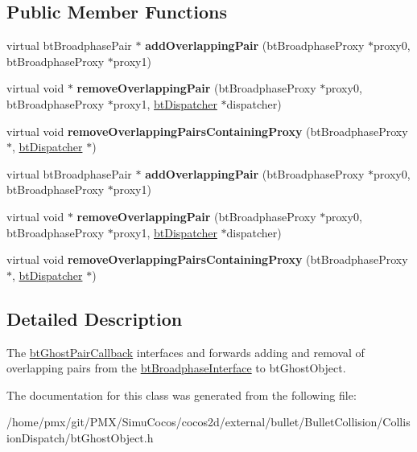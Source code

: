 \subsection*{Public Member Functions}
\begin{DoxyCompactItemize}
\item 
\mbox{\label{classbtGhostPairCallback_ab7f244b881471dfe7ba8ed92f4b7f30f}} 
virtual bt\+Broadphase\+Pair $\ast$ {\bfseries add\+Overlapping\+Pair} (bt\+Broadphase\+Proxy $\ast$proxy0, bt\+Broadphase\+Proxy $\ast$proxy1)
\item 
\mbox{\label{classbtGhostPairCallback_a486c0047f31e9eca3e99d78500a989d4}} 
virtual void $\ast$ {\bfseries remove\+Overlapping\+Pair} (bt\+Broadphase\+Proxy $\ast$proxy0, bt\+Broadphase\+Proxy $\ast$proxy1, \hyperlink{classbtDispatcher}{bt\+Dispatcher} $\ast$dispatcher)
\item 
\mbox{\label{classbtGhostPairCallback_af0107f58ace1c7421f51f9bf026dc57f}} 
virtual void {\bfseries remove\+Overlapping\+Pairs\+Containing\+Proxy} (bt\+Broadphase\+Proxy $\ast$, \hyperlink{classbtDispatcher}{bt\+Dispatcher} $\ast$)
\item 
\mbox{\label{classbtGhostPairCallback_ab7f244b881471dfe7ba8ed92f4b7f30f}} 
virtual bt\+Broadphase\+Pair $\ast$ {\bfseries add\+Overlapping\+Pair} (bt\+Broadphase\+Proxy $\ast$proxy0, bt\+Broadphase\+Proxy $\ast$proxy1)
\item 
\mbox{\label{classbtGhostPairCallback_a486c0047f31e9eca3e99d78500a989d4}} 
virtual void $\ast$ {\bfseries remove\+Overlapping\+Pair} (bt\+Broadphase\+Proxy $\ast$proxy0, bt\+Broadphase\+Proxy $\ast$proxy1, \hyperlink{classbtDispatcher}{bt\+Dispatcher} $\ast$dispatcher)
\item 
\mbox{\label{classbtGhostPairCallback_af0107f58ace1c7421f51f9bf026dc57f}} 
virtual void {\bfseries remove\+Overlapping\+Pairs\+Containing\+Proxy} (bt\+Broadphase\+Proxy $\ast$, \hyperlink{classbtDispatcher}{bt\+Dispatcher} $\ast$)
\end{DoxyCompactItemize}


\subsection{Detailed Description}
The \hyperlink{classbtGhostPairCallback}{bt\+Ghost\+Pair\+Callback} interfaces and forwards adding and removal of overlapping pairs from the \hyperlink{classbtBroadphaseInterface}{bt\+Broadphase\+Interface} to bt\+Ghost\+Object. 

The documentation for this class was generated from the following file\+:\begin{DoxyCompactItemize}
\item 
/home/pmx/git/\+P\+M\+X/\+Simu\+Cocos/cocos2d/external/bullet/\+Bullet\+Collision/\+Collision\+Dispatch/bt\+Ghost\+Object.\+h\end{DoxyCompactItemize}
